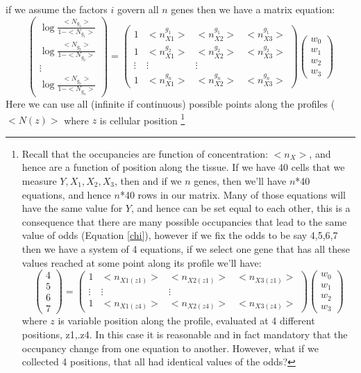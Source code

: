  if we assume the factors $i$ govern all $n$ genes then we have a matrix equation:
\[
\begin{pmatrix} \log{\frac{<N_{g_1}>}{1-<N_{g_1}>}}\\ \log{\frac{<N_{g_2}>}{1-<N_{g_2}>}} \\ \vdots \\  \log{\frac{<N_{g_n}>}{1-<N_{g_n}>}}\end{pmatrix}=
 \begin{pmatrix}
   1& <n_{X1}^{g_1}> & <n_{X2}^{g_1}> & <n_{X3}^{g_1}>  \\
   1&<n_{X1}^{g_2}> & <n_{X2}^{g_2}> & <n_{X3}^{g_2}> \\
    \vdots & \vdots & \vdots \\
   1&<n_{X1}^{g_n}> & <n_{X2}^{g_n}> & <n_{X3}^{g_n}>
 \end{pmatrix} \begin{pmatrix} w_0 \\ w_1 \\ w_2 \\ w_3 \end{pmatrix}
\]
Here we can use all (infinite if continuous) possible points along the profiles ($<N(z)>$ where $z$ is cellular position \footnote[1]{Recall that the occupancies are function of concentration: $<n_X> $, and hence are a function of position along the tissue.  If we have 40 cells that we measure $Y, X_1,X_2,X_3$, then and if we $n$ genes, then we'll have $n$*40 equations, and hence $n$*40 rows in our matrix.  Many of those equations will have the same value for $Y$, and hence can be set equal to each other, this is a consequence that there are many possible occupancies that lead to the same value of odds (Equation \ref{chi}), however if we fix the odds to be say 4,5,6,7 then we have a system of 4 equations, if we select one gene that has all these values reached at some point along its profile we'll have:
\[
\begin{pmatrix} 4 \\ 5 \\ 6 \\ 7\end{pmatrix}=
 \begin{pmatrix}
   1& <n_{X1(z1)}> & <n_{X2(z1)}> & <n_{X3(z1)}>  \\
   \vdots & \vdots & \vdots \\
1& <n_{X1(z4)}> & <n_{X2(z4)}> & <n_{X3(z4)}>
 \end{pmatrix} \begin{pmatrix} w_0 \\ w_1 \\ w_2 \\ w_3 \end{pmatrix}
\]
where $z$ is variable position along the profile, evaluated at 4 different positions, z1,.z4.  In this case it is reasonable and in fact mandatory that the occupancy change from one equation to another.  However, what if we collected 4 positions, that all had identical values of the odds?}

